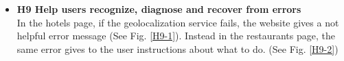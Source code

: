 \begin{itemize}
        \begin{figure}[!ht]
            \begin{minipage}[c]{0.5\textwidth}
                \centering
                \captionsetup{justification=centering}
                \caption{}
                \label{H8-1}
            \end{minipage}%
            \begin{minipage}[c]{0.5\textwidth}
                \centering
                \captionsetup{justification=centering}
                \caption{}
                \label{H8-2}
            \end{minipage}
        \end{figure}
    \pagebreak
    \item \textbf{H9 Help users recognize, diagnose and recover from errors}\\
        In the hotels page, if the geolocalization service fails, the website gives a not helpful error message (See Fig. \ref{H9-1}). Instead in the restaurants page, the same error gives to the user instructions about what to do. (See Fig. \ref{H9-2})\\

\end{itemize}

